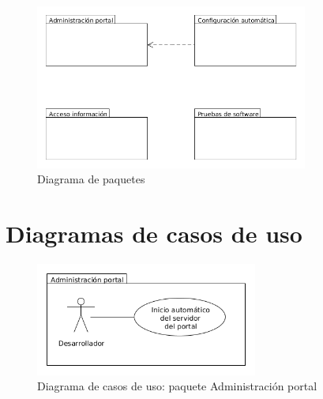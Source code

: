 \begin{figure}[!ht]
  \begin{center}
  \includegraphics[width=0.8\textwidth]{imagenes/diagrama_paquetes.png}
  \caption{Diagrama de paquetes}
  \label{fig:diag_paquetes}
  \end{center}
\end{figure}
 
\section{Diagramas de casos de uso}

\begin{figure}[!ht]
  \begin{center}
  \includegraphics[width=0.65\textwidth]{imagenes/diag_cu_ap.png}
  \caption{Diagrama de casos de uso: paquete Administración portal}
  \label{fig:diag_cu_ap}
  \end{center}
\end{figure}

